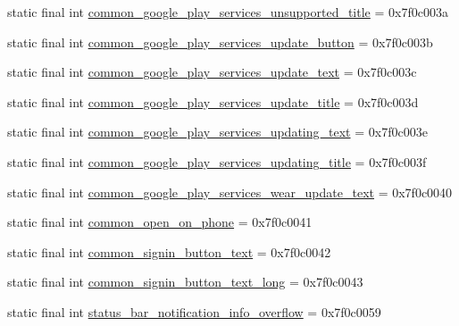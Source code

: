 \begin{DoxyCompactItemize}
static final int \mbox{\hyperlink{classcom_1_1google_1_1android_1_1gms_1_1R_1_1string_aae90359d1c802be694c49e3fc24fbe11}{common\+\_\+google\+\_\+play\+\_\+services\+\_\+unsupported\+\_\+title}} = 0x7f0c003a
\item 
static final int \mbox{\hyperlink{classcom_1_1google_1_1android_1_1gms_1_1R_1_1string_abd5728e5e89557f1b85a93d80446be07}{common\+\_\+google\+\_\+play\+\_\+services\+\_\+update\+\_\+button}} = 0x7f0c003b
\item 
static final int \mbox{\hyperlink{classcom_1_1google_1_1android_1_1gms_1_1R_1_1string_a427d312c3219c8ed53f4f39307451d44}{common\+\_\+google\+\_\+play\+\_\+services\+\_\+update\+\_\+text}} = 0x7f0c003c
\item 
static final int \mbox{\hyperlink{classcom_1_1google_1_1android_1_1gms_1_1R_1_1string_a80c9476ea1b9f4dbf3878d0de00e29df}{common\+\_\+google\+\_\+play\+\_\+services\+\_\+update\+\_\+title}} = 0x7f0c003d
\item 
static final int \mbox{\hyperlink{classcom_1_1google_1_1android_1_1gms_1_1R_1_1string_a4a897d73b7beeed799a7eaacaecbd1e7}{common\+\_\+google\+\_\+play\+\_\+services\+\_\+updating\+\_\+text}} = 0x7f0c003e
\item 
static final int \mbox{\hyperlink{classcom_1_1google_1_1android_1_1gms_1_1R_1_1string_a652df6e22374273a5e49df5ec54cf86b}{common\+\_\+google\+\_\+play\+\_\+services\+\_\+updating\+\_\+title}} = 0x7f0c003f
\item 
static final int \mbox{\hyperlink{classcom_1_1google_1_1android_1_1gms_1_1R_1_1string_acc2609a48d0af8ddf23602dd30ae37ef}{common\+\_\+google\+\_\+play\+\_\+services\+\_\+wear\+\_\+update\+\_\+text}} = 0x7f0c0040
\item 
static final int \mbox{\hyperlink{classcom_1_1google_1_1android_1_1gms_1_1R_1_1string_a18e434a8b6117aa1ba35d7e1b7ad58b2}{common\+\_\+open\+\_\+on\+\_\+phone}} = 0x7f0c0041
\item 
static final int \mbox{\hyperlink{classcom_1_1google_1_1android_1_1gms_1_1R_1_1string_a348f4d6d15b898cc7c5660fa8b4ad985}{common\+\_\+signin\+\_\+button\+\_\+text}} = 0x7f0c0042
\item 
static final int \mbox{\hyperlink{classcom_1_1google_1_1android_1_1gms_1_1R_1_1string_aa178f47aa1af57f8add4fe9973e376b5}{common\+\_\+signin\+\_\+button\+\_\+text\+\_\+long}} = 0x7f0c0043
\item 
static final int \mbox{\hyperlink{classcom_1_1google_1_1android_1_1gms_1_1R_1_1string_af5f1a9d9dbb0e7f19a242867de85442c}{status\+\_\+bar\+\_\+notification\+\_\+info\+\_\+overflow}} = 0x7f0c0059
\end{DoxyCompactItemize}



